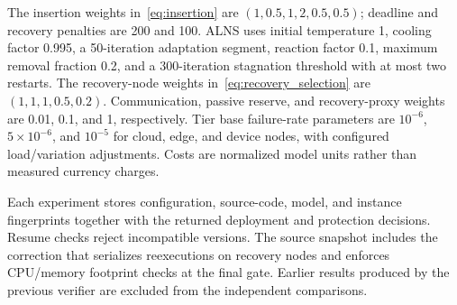 The insertion weights in~\eqref{eq:insertion} are
$(1,0.5,1,2,0.5,0.5)$; deadline and recovery penalties are 200 and 100.
ALNS uses initial temperature 1, cooling factor 0.995, a 50-iteration
adaptation segment, reaction factor 0.1, maximum removal fraction 0.2,
and a 300-iteration stagnation threshold with at most two restarts.
The recovery-node weights in~\eqref{eq:recovery_selection} are
$(1,1,1,0.5,0.2)$. Communication, passive reserve, and recovery-proxy
weights are 0.01, 0.1, and 1, respectively. Tier base failure-rate
parameters are $10^{-6}$, $5\times10^{-6}$, and $10^{-5}$ for cloud,
edge, and device nodes, with configured load/variation adjustments.
Costs are normalized model units rather than measured currency charges.

Each experiment stores configuration, source-code, model, and instance
fingerprints together with the returned deployment and protection decisions.
Resume checks reject incompatible versions. The source snapshot includes
the correction that serializes reexecutions on recovery nodes and enforces
CPU/memory footprint checks at the final gate. Earlier results produced by
the previous verifier are excluded from the independent comparisons.
